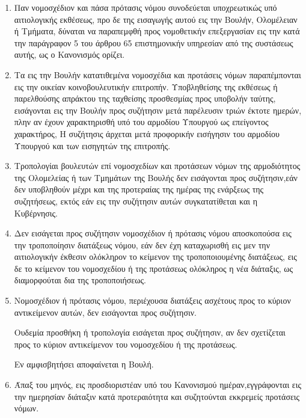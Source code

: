 \documentclass[twoside, a4paper, 10pt]{article}
\begin{document}
\begin{multicols}{2}
\begin{enumerate}
\begin{BigQuote}
\begin{enumerate}
  \item[1.] Παν νομοσχέδιον και πάσα πρότασις νόμου συνοδεύεται υποχρεωτικώς υπό αιτιολογικής εκθέσεως, προ δε της εισαγωγής αυτού εις την Βουλήν, Ολομέλειαν ή Τμήματα, δύναται να παραπεμφθή προς νομοθετικήν επεξεργασίαν εις την κατά την παράγραφον 5 του άρθρου 65 επιστημονικήν υπηρεσίαν από της συστάσεως αυτής, ως ο Κανονισμός ορίζει.
  \item[2.] Τα εις την Βουλήν κατατιθεμένα νομοσχέδια και προτάσεις νόμων παραπέμπονται εις την οικείαν κοινοβουλευτικήν επιτροπήν. Υποβληθείσης της εκθέσεως ή παρελθούσης απράκτου της ταχθείσης προσθεσμίας προς υποβολήν ταύτης, εισάγονται εις την Βουλήν προς συζήτησιν μετά παρέλευσιν τριών έκτοτε ημερών, πλην αν έχουν χαρακτηρισθή υπό του αρμοδίου Υπουργού ως επείγοντος χαρακτήρος, Η συζήτησις άρχεται μετά προφορικήν εισήγησιν του αρμοδίου Υπουργού και των εισηγητών της επιτροπής.
  \item[3.] Τροπολογίαι βουλευτών επί νομοσχεδίων και προτάσεων νόμων της αρμοδιότητος της Ολομελείας ή των Τμημάτων της Βουλής δεν εισάγονται προς συζήτησιν,εάν δεν υποβληθούν μέχρι και της προτεραίας της ημέρας της ενάρξεως της συζητήσεως, εκτός εάν εις την συζήτησιν αυτών συγκατατίθεται και η Κυβέρνησις.
  \item[4.] Δεν εισάγεται προς συζήτησιν νομοσχέδιον ή πρότασις νόμου αποσκοπούσα εις την τροποποίησιν διατάξεως νόμου, εάν δεν έχη καταχωρισθή εις μεν την αιτιολογικήν έκθεσιν ολόκληρον το κείμενον της τροποποιουμένης διατάξεως, εις δε το κείμενον του νομοσχεδίου ή της προτάσεως ολόκληρος η νέα διάταξις, ως διαμορφούται δια της τροποποιήσεως.
  \item[5.] Νομοσχέδιον ή πρότασις νόμου, περιέχουσα διατάξεις ασχέτους προς το κύριον αντικείμενον αυτών, δεν εισάγονται προς συζήτησιν.

	Ουδεμία προσθήκη ή τροπολογία εισάγεται προς συζήτησιν, αν δεν σχετίζεται προς το κύριον αντικείμενον του νομοσχεδίου ή της προτάσεως.

	Εν αμφισβητήσει αποφαίνεται η Βουλή.
  \item[6.] Άπαξ του μηνός, εις προσδιοριστέαν υπό του Κανονισμού ημέραν,εγγράφονται εις την ημερησίαν διάταξιν κατά προτεραιότητα και συζητούνται εκκρεμείς προτάσεις νόμων.
\end{enumerate}


\end{BigQuote}
\end{enumerate}
\end{multicols}
\end{document}
